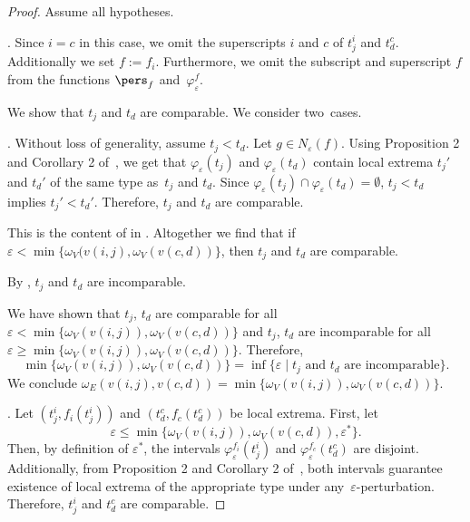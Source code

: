 \begin{proof}
    Assume all hypotheses.

    .
    Since $i=c$ in this case, we omit the superscripts $i$ and $c$ of $t_j^i$
    and $t_d^c$. Additionally we set $f := f_i$. Furthermore, we omit the
    subscript and superscript $f$ from the functions $\pers_f$
    and~$\varphi_{\varepsilon}^f$.  
    
     We show that $t_j$ and $t_d$ are comparable.  We consider two~cases.

       . Without loss of generality, assume $t_j<t_d$. Let $g\in
            N_{\varepsilon}(f)$. Using Proposition 2 and Corollary 2
            of~\cite{BerryUsing20}, we get that $\varphi_{\varepsilon}(t_j)$ and
            $\varphi_{\varepsilon}(t_d)$ contain local extrema $t_j'$ and $t_d'$
            of the same type as~$t_j$ and $t_d$. Since
            $\varphi_{\varepsilon}(t_j) \cap \varphi_{\varepsilon}(t_d) =
            \emptyset$, $t_j < t_d$ implies $t_j' < t_d'$. Therefore, $t_j$ and
            $t_d$ are comparable.

         This is the content of  in .
    Altogether we find that if
    $\varepsilon < \min\{\omega_V(v(i,j), \omega_V(v(c,d))\}$, then $t_j$ and $t_d$ are
    comparable. 
    
    By , $t_j$ and $t_d$ are
    incomparable.

    We have shown that $t_j$, $t_d$ are comparable for all $\varepsilon <
    \min\{\omega_V(v(i,j)), \omega_V(v(c,d))\}$ and $t_j$, $t_d$ are incomparable for
    all~$\varepsilon \geq \min\{\omega_V(v(i,j)), \omega_V(v(c,d))\}$. Therefore, \[
        \min\{\omega_V(v(i,j)), \omega_V(v(c,d))\} =  \inf\{\varepsilon\mid t_j \text{ and }
        t_d \text{ are incomparable}\}. \] We conclude  $\omega_{E}(v(i,j),
    v(c,d)) = \min\{\omega_V(v(i,j)), \omega_V(v(c,d))\}$.

\vspace{1ex}

    .
    Let $(t_j^i, f_i(t_j^i))$ and $(t_d^c, f_c(t_d^c))$ be local extrema.  First,
    let
    $$\varepsilon\leq\min\{\omega_V(v(i,j)), \omega_V(v(c,d)),
    \varepsilon^*\}.$$
     Then, by definition of $\varepsilon^*$, the intervals
    $\varphi^{f_i}_{\varepsilon}(t_j^i)$ and
    $\varphi^{f_c}_{\varepsilon}(t_d^c)$ are disjoint. Additionally, from
    Proposition 2 and Corollary 2 of~\cite{BerryUsing20},  both intervals
    guarantee existence of local extrema of the appropriate type under
    any~$\varepsilon$-perturbation. Therefore, $t_j^i$ and $t_d^c$ are
    comparable.


\end{proof}
